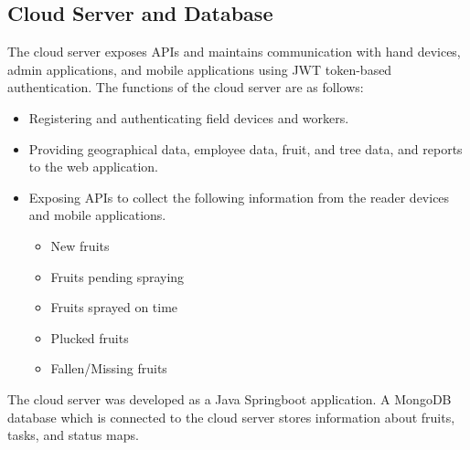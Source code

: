\documentclass[journal]{IEEEtran}
\begin{document}
\subsection{Cloud Server and Database}
The cloud server exposes APIs and maintains communication with hand devices, admin applications, and mobile applications using JWT token-based authentication. The functions of the cloud server are as follows:
\begin{itemize}
	\item Registering and authenticating field devices and workers.
	\item Providing geographical data, employee data, fruit, and tree data, and reports to the web application.
	\item Exposing APIs to collect the following information from the reader devices and mobile applications.
	\begin{itemize}
		\item New fruits
		\item Fruits pending spraying
		\item Fruits sprayed on time
		\item Plucked fruits
		\item Fallen/Missing fruits
	\end{itemize}
\end{itemize}
The cloud server was developed as a Java Springboot application. A MongoDB \cite{gyHorodi2015comparative} database which is connected to the cloud server stores information about fruits, tasks, and status maps.
\end{document}

